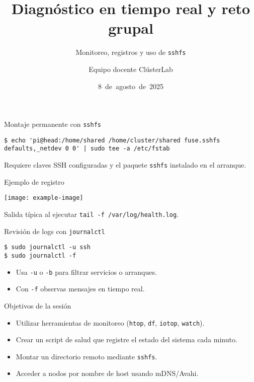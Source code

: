 \documentclass[aspectratio=169,professionalfonts]{beamer}
\title[ClústerLab • Día 3]{Diagnóstico en tiempo real y reto grupal}
\subtitle{Monitoreo, registros y uso de \texttt{sshfs}}
\author{Equipo docente ClústerLab}
\date{8 de agosto de 2025}
\begin{document}
\begin{frame}[plain]
  \titlepage
\end{frame}

\begin{frame}[fragile]{Montaje permanente con \texttt{sshfs}}
  \begin{verbatim}
$ echo 'pi@head:/home/shared /home/cluster/shared fuse.sshfs defaults,_netdev 0 0' | sudo tee -a /etc/fstab
  \end{verbatim}
  Requiere claves SSH configuradas y el paquete \texttt{sshfs} instalado en el arranque.
\end{frame}

\begin{frame}[fragile]{Ejemplo de registro}
  \begin{center}
    \texttt{[image: example-image]}
  \end{center}
  Salida típica al ejecutar \texttt{tail -f /var/log/health.log}.
\end{frame}

\begin{frame}[fragile]{Revisión de logs con \texttt{journalctl}}
  \begin{verbatim}
$ sudo journalctl -u ssh
$ sudo journalctl -f
  \end{verbatim}
  \begin{itemize}
    \item Usa \texttt{-u} o \texttt{-b} para filtrar servicios o arranques.
    \item Con \texttt{-f} observas mensajes en tiempo real.
  \end{itemize}
\end{frame}

\begin{frame}[fragile]{Objetivos de la sesión}
  \begin{itemize}
    \item Utilizar herramientas de monitoreo (\texttt{htop}, \texttt{df}, \texttt{iotop}, \texttt{watch}).
    \item Crear un script de salud que registre el estado del sistema cada minuto.
    \item Montar un directorio remoto mediante \texttt{sshfs}.
    \item Acceder a nodos por nombre de host usando mDNS/Avahi.
  \end{itemize}
\end{frame}
\end{document}
